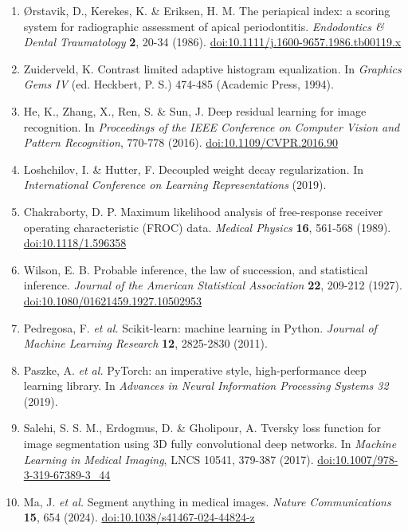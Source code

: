 \documentclass[twocolumn]{article}
\begin{document}
{\begin{enumerate}[leftmargin=5mm,itemsep=1mm]
\item Ørstavik, D., Kerekes, K. \& Eriksen, H. M. The periapical index: a scoring system for radiographic assessment of apical periodontitis. \textit{Endodontics \& Dental Traumatology} \textbf{2}, 20-34 (1986). \href{https://doi.org/10.1111/j.1600-9657.1986.tb00119.x}{doi:10.1111/j.1600-9657.1986.tb00119.x}
\item Zuiderveld, K. Contrast limited adaptive histogram equalization. In \textit{Graphics Gems IV} (ed. Heckbert, P. S.) 474-485 (Academic Press, 1994).
\item He, K., Zhang, X., Ren, S. \& Sun, J. Deep residual learning for image recognition. In \textit{Proceedings of the IEEE Conference on Computer Vision and Pattern Recognition}, 770-778 (2016). \href{https://doi.org/10.1109/CVPR.2016.90}{doi:10.1109/CVPR.2016.90}
\item Loshchilov, I. \& Hutter, F. Decoupled weight decay regularization. In \textit{International Conference on Learning Representations} (2019).
\item Chakraborty, D. P. Maximum likelihood analysis of free-response receiver operating characteristic (FROC) data. \textit{Medical Physics} \textbf{16}, 561-568 (1989). \href{https://doi.org/10.1118/1.596358}{doi:10.1118/1.596358}
\item Wilson, E. B. Probable inference, the law of succession, and statistical inference. \textit{Journal of the American Statistical Association} \textbf{22}, 209-212 (1927). \href{https://doi.org/10.1080/01621459.1927.10502953}{doi:10.1080/01621459.1927.10502953}
\item Pedregosa, F. \textit{et al.} Scikit-learn: machine learning in Python. \textit{Journal of Machine Learning Research} \textbf{12}, 2825-2830 (2011).
\item Paszke, A. \textit{et al.} PyTorch: an imperative style, high-performance deep learning library. In \textit{Advances in Neural Information Processing Systems 32} (2019).
\item Salehi, S. S. M., Erdogmus, D. \& Gholipour, A. Tversky loss function for image segmentation using 3D fully convolutional deep networks. In \textit{Machine Learning in Medical Imaging}, LNCS 10541, 379-387 (2017). \href{https://doi.org/10.1007/978-3-319-67389-3_44}{doi:10.1007/978-3-319-67389-3\_44}
\item Ma, J. \textit{et al.} Segment anything in medical images. \textit{Nature Communications} \textbf{15}, 654 (2024). \href{https://doi.org/10.1038/s41467-024-44824-z}{doi:10.1038/s41467-024-44824-z}
\end{enumerate}}
\end{document}
